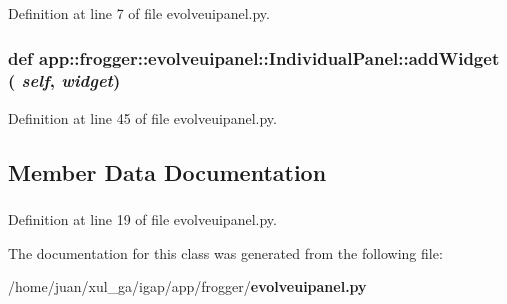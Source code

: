 Definition at line 7 of file evolveuipanel.py.
\subsubsection{\setlength{\rightskip}{0pt plus 5cm}def app::frogger::evolveuipanel::IndividualPanel::addWidget ( {\em self},  {\em widget})}\label{classapp_1_1frogger_1_1evolveuipanel_1_1IndividualPanel_ddeb36ba62ee659770bc81121b820d16}




Definition at line 45 of file evolveuipanel.py.

\subsection{Member Data Documentation}
\subsubsection{}\label{classapp_1_1frogger_1_1evolveuipanel_1_1IndividualPanel_c9f026d9bd95c8c70f6712d4c1e1715b}




Definition at line 19 of file evolveuipanel.py.

The documentation for this class was generated from the following file:\begin{CompactItemize}
\item 
/home/juan/xul\_\-ga/igap/app/frogger/{\bf evolveuipanel.py}\end{CompactItemize}
